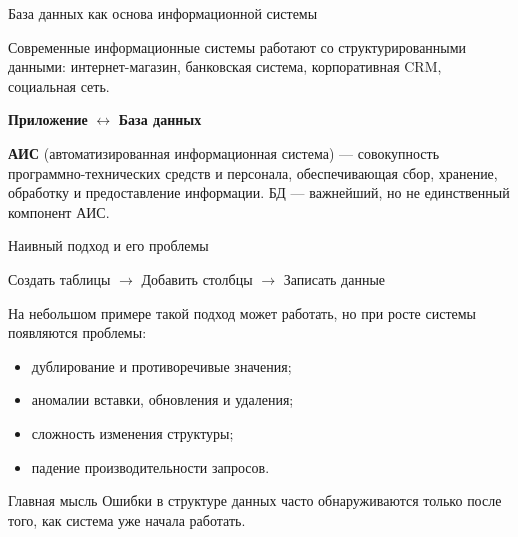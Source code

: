 \documentclass[aspectratio=169]{beamer}
\begin{document}
\begin{frame}{База данных как основа информационной системы}

Современные информационные системы работают
со структурированными данными: интернет-магазин,
банковская система, корпоративная CRM, социальная сеть.

\vspace{0.4cm}

\begin{center}
\Large
\textbf{Приложение}
$\longleftrightarrow$
\textbf{База данных}
\end{center}

\vspace{0.4cm}

\textbf{АИС} (автоматизированная информационная система) —
совокупность программно-технических средств и персонала,
обеспечивающая сбор, хранение, обработку и предоставление
информации. БД — важнейший, но не единственный компонент АИС.

\end{frame}


\begin{frame}{Наивный подход и его проблемы}

\begin{center}
\large
Создать таблицы
$\rightarrow$
Добавить столбцы
$\rightarrow$
Записать данные
\end{center}

\vspace{0.3cm}

На небольшом примере такой подход может работать,
но при росте системы появляются проблемы:

\begin{itemize}
  \item дублирование и противоречивые значения;
  \item аномалии вставки, обновления и удаления;
  \item сложность изменения структуры;
  \item падение производительности запросов.
\end{itemize}

\vspace{0.3cm}

\begin{alertblock}{Главная мысль}
Ошибки в структуре данных часто обнаруживаются
только после того, как система уже начала работать.
\end{alertblock}

\end{frame}
\end{document}
